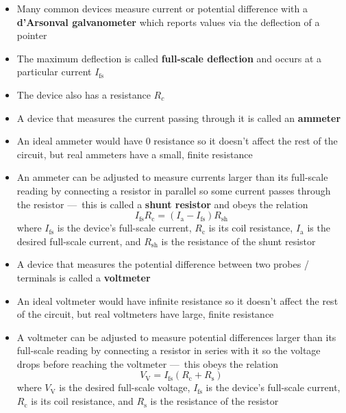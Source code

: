 \documentclass{article}
\begin{document}
\begin{itemize}
  \item Many common devices measure current or potential difference with a \textbf{d'Arsonval galvanometer} which reports values via the deflection of a pointer

  \item The maximum deflection is called \textbf{full-scale deflection} and occurs at a particular current $I_\textrm{fs}$

  \item The device also has a resistance $R_c$

  \item A device that measures the current passing through it is called an \textbf{ammeter}

  \item An ideal ammeter would have 0 resistance so it doesn't affect the rest of the circuit, but real ammeters have a small, finite resistance

  \item An ammeter can be adjusted to measure currents larger than its full-scale reading by connecting a resistor in parallel so some current passes through the resistor — this is called a \textbf{shunt resistor} and obeys the relation \[I_\textrm{fs} R_\textrm{c} = (I_\textrm{a} - I_\textrm{fs}) R_\textrm{sh}\] where $I_\textrm{fs}$ is the device's full-scale current, $R_\textrm{c}$ is its coil resistance, $I_\textrm{a}$ is the desired full-scale current, and $R_\textrm{sh}$ is the resistance of the shunt resistor

  \item A device that measures the potential difference between two probes / terminals is called a \textbf{voltmeter}

  \item An ideal voltmeter would have infinite resistance so it doesn't affect the rest of the circuit, but real voltmeters have large, finite resistance

  \item A voltmeter can be adjusted to measure potential differences larger than its full-scale reading by connecting a resistor in series with it so the voltage drops before reaching the voltmeter — this obeys the relation \[V_\textrm{V} = I_\textrm{fs} (R_\textrm{c} + R_\textrm{s})\] where $V_\textrm{V}$ is the desired full-scale voltage, $I_\textrm{fs}$ is the device's full-scale current, $R_\textrm{c}$ is its coil resistance, and $R_\textrm{s}$ is the resistance of the resistor


\end{itemize}
\end{document}
